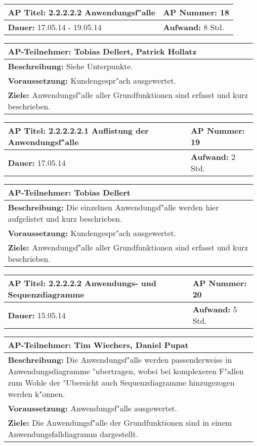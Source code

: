 \begin{tabular}{|p{7.43cm}|p{7.43cm}|}
\hline
\textbf{AP Titel: }2.2.2.2.2 Anwendungsf"alle& \textbf{AP Nummer: }18\\ 
\hline
\textbf{Dauer: }17.05.14 - 19.05.14& \textbf{Aufwand: } 8 Std.\\
\hline
\end{tabular}
\begin{tabular}{|p{15.3cm}|}
\hline
\textbf{AP-Teilnehmer: }Tobias Dellert, Patrick Hollatz\\
\hline
\textbf{Beschreibung: }Siehe Unterpunkte.\\
\hline
\textbf{Voraussetzung: }Kundengespr"ach ausgewertet.\\
\hline 
\textbf{Ziele: }Anwendungsf"alle aller Grundfunktionen sind erfasst und kurz beschrieben.\\
\hline 
\end{tabular}

\begin{tabular}{|p{7.43cm}|p{7.43cm}|}
\hline
\textbf{AP Titel: }2.2.2.2.2.1 Auflistung der Anwendungsf"alle& \textbf{AP Nummer: }19\\ 
\hline
\textbf{Dauer: }17.05.14& \textbf{Aufwand: } 2 Std.\\
\hline
\end{tabular}
\begin{tabular}{|p{15.3cm}|}
\hline
\textbf{AP-Teilnehmer: }Tobias Dellert\\
\hline
\textbf{Beschreibung: }Die einzelnen Anwendungsf"alle werden hier aufgelistet und kurz beschrieben.\\
\hline
\textbf{Voraussetzung: }Kundengespr"ach ausgewertet.\\
\hline 
\textbf{Ziele: }Anwendungsf"alle aller Grundfunktionen sind erfasst und kurz beschrieben.\\
\hline 
\end{tabular}

\begin{tabular}{|p{7.43cm}|p{7.43cm}|}
\hline
\textbf{AP Titel: }2.2.2.2.2 Anwendungs- und Sequenzdiagramme& \textbf{AP Nummer: }20\\ 
\hline
\textbf{Dauer: }15.05.14& \textbf{Aufwand: } 5 Std.\\
\hline
\end{tabular}
\begin{tabular}{|p{15.3cm}|}
\hline
\textbf{AP-Teilnehmer: }Tim Wiechers, Daniel Pupat\\
\hline
\textbf{Beschreibung: }Die Anwendungsf"alle werden passenderweise in Anwendungsdiagramme "ubertragen, wobei bei komplexeren F"allen zum Wohle der "Ubersicht auch Sequenzdiagramme hinzugezogen werden k"onnen.\\
\hline
\textbf{Voraussetzung: }Anwendungsf"alle ausgewertet.\\
\hline 
\textbf{Ziele: }Die Anwendungsf"alle der Grundfunktionen sind in einem Anwendungsfalldiagramm dargestellt.\\
\hline 
\end{tabular}

